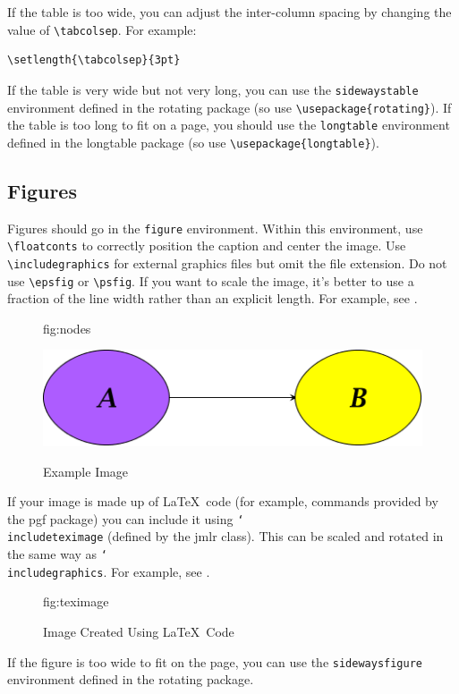 \documentclass[pmlr]{jmlr}%
\newcommand{\cs}[1]{\texttt{\char`\\#1}}
\begin{document}
If the table is too wide, you can adjust the inter-column
spacing by changing the value of \verb|\tabcolsep|. For
example:
\begin{verbatim}
\setlength{\tabcolsep}{3pt}
\end{verbatim}
If the table is very wide but not very long, you can use the
\texttt{sidewaystable} environment defined in the
\textsf{rotating} package (so use \verb|\usepackage{rotating}|).
If the table is too long to fit on a page, you should use the
\texttt{longtable} environment defined in the \textsf{longtable}
package (so use \verb|\usepackage{longtable}|).

\subsection{Figures}
\label{sec:figures}

Figures should go in the \texttt{figure} environment. Within this
environment, use \verb|\floatconts| to correctly position the
caption and center the image. Use \verb|\includegraphics|
for external graphics files but omit the file extension. Do not
use \verb|\epsfig| or \verb|\psfig|. If you want to scale the
image, it's better to use a fraction of the line width rather
than an explicit length. For example, see .

\begin{figure}[htbp]
\floatconts
  {fig:nodes}
  {\caption{Example Image}}
  {\includegraphics[width=0.5\linewidth]{images/nodes}}
\end{figure}

If your image is made up of \LaTeX\ code (for example, commands
provided by the \textsf{pgf} package) you can include it using
\cs{includeteximage} (defined by the \textsf{jmlr} class). This
can be scaled and rotated in the same way as \cs{includegraphics}.
For example, see .

\begin{figure}[htbp]
\floatconts
  {fig:teximage}
  {\caption{Image Created Using \LaTeX\ Code}}
  {}
\end{figure}

If the figure is too wide to fit on the page, you can use the
\texttt{sidewaysfigure} environment defined in the
\textsf{rotating} package.
\end{document}
